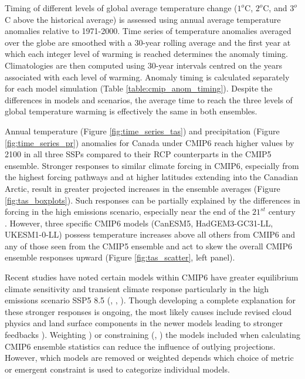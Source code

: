 \documentclass[]{scrartcl}
\begin{document}
Timing of different levels of global average temperature change ($1^o$C, $2^o$C, and $3^o$C above the historical average) is assessed using annual average temperature anomalies relative to 1971-2000. Time series of temperature anomalies averaged over the globe are smoothed with a 30-year rolling average and the first year at which each integer level of warming is reached determines the anomaly timing. Climatologies are then computed using 30-year intervals centred on the years associated with each level of warming. Anomaly timing is calculated separately for each model simulation (Table \ref{table:cmip_anom_timing}). Despite the differences in models and scenarios, the average time to reach the three levels of global temperature warming is effectively the same in both ensembles. 

Annual temperature (Figure \ref{fig:time_series_tas}) and precipitation (Figure \ref{fig:time_series_pr}) anomalies for Canada under CMIP6 reach higher values by 2100 in all three SSPs compared to their RCP counterparts in the CMIP5 ensemble. Stronger responses to similar climate forcing in CMIP6, especially from the highest forcing pathways and at higher latitudes extending into the Canadian Arctic, result in greater projected increases in the ensemble averages (Figure \ref{fig:tas_boxplots}). Such responses can be partially explained by the differences in forcing in the high emissions scenario, especially near the end of the $21^{st}$ century \citep{oneill_scenario_2016}. However, three specific CMIP6 models (CanESM5, HadGEM3-GC31-LL, UKESM1-0-LL) possess temperature increases above all others from CMIP6 and any of those seen from the CMIP5 ensemble and act to skew the overall CMIP6 ensemble responses upward (Figure \ref{fig:tas_scatter}, left panel).

Recent studies have noted certain models within CMIP6 have greater equilibrium climate sensitivity and transient climate response particularly in the high emissions scenario SSP5 8.5 (\citealt{Tokarska2020}, \citealt{Liang2020}, \citealt{Brunner2020}). Though developing a complete explanation for these stronger responses is ongoing, the most likely causes include revised cloud physics and land surface components in the newer models leading to stronger feedbacks \citep{swart_canadian_2019}). Weighting \citep{Brunner2020}) or constraining (\citealt{Tokarska2020}, \citealt{Liang2020}) the models included when calculating CMIP6 ensemble statistics can reduce the influence of outlying projections. However, which models are removed or weighted depends which choice of metric or emergent constraint is used to categorize individual models. 
\end{document}
